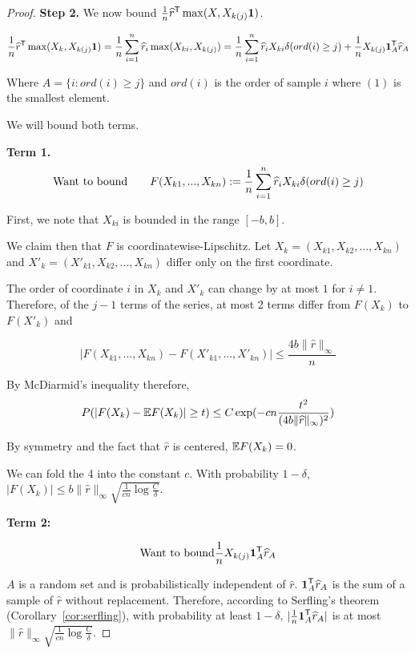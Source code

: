 \begin{proof}
\textbf{Step 2.} We now bound $\frac{1}{n} \widehat{r}^{\mathsf{T}} \max( X, X_{k(j)} \mbox{\boldmath $1$})$.

\[
\frac{1}{n} \widehat{r}^{\mathsf{T}} \max(X_k, X_{k(j)} \mbox{\boldmath $1$}) = \frac{1}{n} \sum_{i=1}^n \widehat{r}_i \max(X_{ki}, X_{k(j)}) = \frac{1}{n} \sum_{i=1}^n \widehat{r}_i X_{ki} \delta(ord(i) \geq j) + \frac{1}{n} X_{k(j)} \mbox{\boldmath $1$}_A^{\mathsf{T}} \widehat{r}_A
\]

Where $A = \{ i : ord(i) \geq j\}$ and $ord(i)$ is the order of sample $i$ where $(1)$ is the smallest element.

We will bound both terms.

\textbf{Term 1.}
\[
\textrm{Want to bound} \qquad F(X_{k1},...,X_{kn}) := \frac{1}{n}\sum_{i=1}^n \widehat{r}_i X_{ki} \delta(ord(i) \geq j) 
\]

First, we note that $X_{ki}$ is bounded in the range $[-b,b]$. 

We claim then that $F$ is coordinatewise-Lipschitz. Let $X_k = (X_{k1}, X_{k2},...,X_{kn})$ and $X'_k = (X'_{k1}, X_{k2}, ..., X_{kn})$ differ only on the first coordinate. 

The order of coordinate $i$ in $X_k$ and $X'_k$ can change by at most $1$ for $i \neq 1$. Therefore, of the $j-1$ terms of the series, at most 2 terms differ from $F(X_k)$ to $F(X'_k)$ and

$$ | F(X_{k1}, ..., X_{kn}) - F(X'_{k1}, ..., X'_{kn}) | \leq \frac{4 b \|\hat{r}\|_\infty}{n} $$

By McDiarmid's inequality therefore, 
\[
P( | F(X_k) - {\mathbb E} F(X_k) | \geq t ) \leq C \exp( - c n\frac{t^2}{ (4 b \|\widehat{r}\|_\infty)^2})
\]

By symmetry and the fact that $\hat{r}$ is centered, ${\mathbb E} F(X_k) = 0$.

We can fold the 4 into the constant $c$. With probability $1-\delta$, $|F(X_k)| \leq b \|\hat{r}\|_\infty \sqrt{   \frac{1}{cn} \log \frac{C}{\delta}}$. 

\textbf{Term 2:}

\[
\textrm{Want to bound}   \frac{1}{n} X_{k(j)} \mbox{\boldmath $1$}_A^{\mathsf{T}} \widehat{r}_A
\]

$A$ is a random set and is probabilistically independent of $\hat{r}$.  $\mbox{\boldmath $1$}_A^{\mathsf{T}} \widehat{r}_A$ is the sum of a sample of $\hat{r}$ without replacement. Therefore, according to Serfling's theorem (Corollary~\ref{cor:serfling}), with probability at least $1-\delta$, $|\frac{1}{n} \mbox{\boldmath $1$}_A^{\mathsf{T}} \widehat{r}_A|$ is at most $\| \hat{r} \|_\infty \sqrt{ \frac{1}{cn} \log \frac{C}{\delta}}$.


\end{proof}
